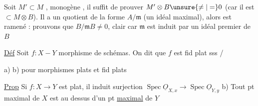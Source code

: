  Soit $M'\subset M$ , monogène  , il suffit de prouver $M'\otimes B\unsure{\ne|=}0$ (car il est $\subset M\otimes B$). Il a un quotient de la forme $A/\mathfrak m$ (un idéal maximal), alors   est ramené : prouvons que $B/\mathfrak mB\ne0$, clair car $\mathfrak m$ est induit par un idéal premier de $B$

\uline{Déf} Soit $f:X\mathrel{-}Y$ morphisme de   schémas.  On dit que  $f$ est fid plat sss \quad /

a) b) pour morphismes plats et fid plats

\uline{Prop} Si $f:X\longrightarrow Y$ est plat,  il induit   surjection $\operatorname{Spec}\underline O_{X,x}\longrightarrow\operatorname{Spec}\underline O_{Y,y}$ \quad b) Tout pt maximal de $X$ est au dessus d'un pt \uline{maximal} de $Y$

